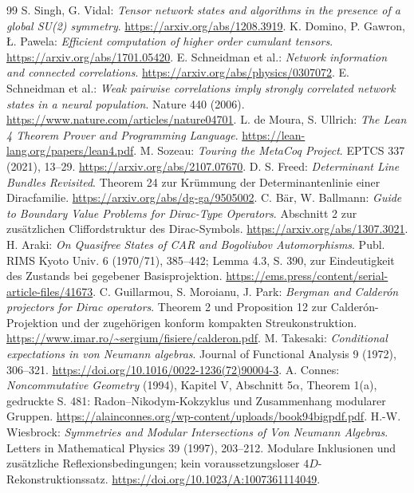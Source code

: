 \begin{thebibliography}{99}
 S. Singh, G. Vidal: \emph{Tensor network states and algorithms in the presence of a global SU(2) symmetry}. \url{https://arxiv.org/abs/1208.3919}.
 K. Domino, P. Gawron, Ł. Pawela: \emph{Efficient computation of higher order cumulant tensors}. \url{https://arxiv.org/abs/1701.05420}.
 E. Schneidman et al.: \emph{Network information and connected correlations}. \url{https://arxiv.org/abs/physics/0307072}.
 E. Schneidman et al.: \emph{Weak pairwise correlations imply strongly correlated network states in a neural population}. Nature 440 (2006). \url{https://www.nature.com/articles/nature04701}.
 L. de Moura, S. Ullrich: \emph{The Lean 4 Theorem Prover and Programming Language}. \url{https://lean-lang.org/papers/lean4.pdf}.
 M. Sozeau: \emph{Touring the MetaCoq Project}. EPTCS 337 (2021), 13--29. \url{https://arxiv.org/abs/2107.07670}.
 D. S. Freed: \emph{Determinant Line Bundles Revisited}. Theorem 24 zur Krümmung der Determinantenlinie einer Diracfamilie. \url{https://arxiv.org/abs/dg-ga/9505002}.
 C. Bär, W. Ballmann: \emph{Guide to Boundary Value Problems for Dirac-Type Operators}. Abschnitt 2 zur zusätzlichen Cliffordstruktur des Dirac-Symbols. \url{https://arxiv.org/abs/1307.3021}.
 H. Araki: \emph{On Quasifree States of CAR and Bogoliubov Automorphisms}. Publ. RIMS Kyoto Univ. 6 (1970/71), 385--442; Lemma 4.3, S. 390, zur Eindeutigkeit des Zustands bei gegebener Basisprojektion. \url{https://ems.press/content/serial-article-files/41673}.
 C. Guillarmou, S. Moroianu, J. Park: \emph{Bergman and Calderón projectors for Dirac operators}. Theorem 2 und Proposition 12 zur Calderón-Projektion und der zugehörigen konform kompakten Streukonstruktion. \url{https://www.imar.ro/~sergium/fisiere/calderon.pdf}.
 M. Takesaki: \emph{Conditional expectations in von Neumann algebras}. Journal of Functional Analysis 9 (1972), 306--321. \url{https://doi.org/10.1016/0022-1236(72)90004-3}.
 A. Connes: \emph{Noncommutative Geometry} (1994), Kapitel V, Abschnitt 5$\alpha$, Theorem 1(a), gedruckte S. 481: Radon--Nikodym-Kokzyklus und Zusammenhang modularer Gruppen. \url{https://alainconnes.org/wp-content/uploads/book94bigpdf.pdf}.
 H.-W. Wiesbrock: \emph{Symmetries and Modular Intersections of Von Neumann Algebras}. Letters in Mathematical Physics 39 (1997), 203--212. Modulare Inklusionen und zusätzliche Reflexionsbedingungen; kein voraussetzungsloser $4D$-Rekonstruktionssatz. \url{https://doi.org/10.1023/A:1007361114049}.

\end{thebibliography}
